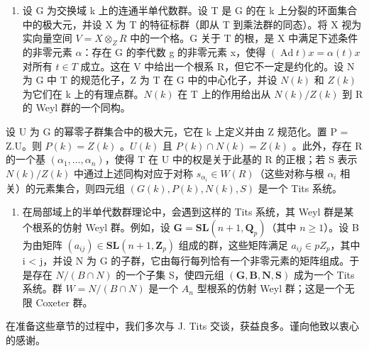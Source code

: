 \begin{enumerate}
\def\labelenumi{\Roman{enumi}.}
\setcounter{enumi}{2}
\tightlist
\item
  设 G 为交换域 k 上的连通半单代数群。设 T 是 G 的在 k 上分裂的环面集合中的极大元，并设 X 为 T 的特征标群（即从 T 到乘法群的同态）。将 X 视为实向量空间 \(V = X \otimes_{Z} R\) 中的一个格。G 关于 T 的根，是 X 中满足下述条件的非零元素 \(\alpha\)：存在 G 的李代数 g 的非零元素 x，使得 \((\operatorname{Ad} t)x = \alpha(t)x\) 对所有 \(t \in T\) 成立。这在 V 中给出一个根系 R，但它不一定是约化的。设 N 为 G 中 T 的规范化子，Z 为 T 在 G 中的中心化子，并设 \(N(k)\) 和 \(Z(k)\) 为它们在 k 上的有理点群。\(N(k)\) 在 T 上的作用给出从 \(N(k)/Z(k)\) 到 R 的 Weyl 群的一个同构。
\end{enumerate}

设 U 为 G 的幂零子群集合中的极大元，它在 k 上定义并由 Z 规范化。置 P = Z.U。则 \(P(k) = Z(k)\) 。\(U(k)\) 且 \(P(k) \cap N(k) = Z(k)\) 。此外，存在 R 的一个基 \((\alpha_{1}, \ldots, \alpha_{n})\)，使得 T 在 U 中的权是关于此基的 R 的正根；若 S 表示 \(N(k)/Z(k)\) 中通过上述同构对应于对称 \(s_{\alpha_{i}} \in W(R)\)（这些对称与根 \(\alpha_{i}\) 相关）的元素集合，则四元组 \((G(k), P(k), N(k), S)\) 是一个 Tits 系统。

\begin{enumerate}
\def\labelenumi{\Roman{enumi}.}
\setcounter{enumi}{3}
\tightlist
\item
  在局部域上的半单代数群理论中，会遇到这样的 Tits 系统，其 Weyl 群是某个根系的仿射 Weyl 群。例如，设 \(\mathbf{G} = \mathbf{S}\mathbf{L}(n + 1, \mathbf{Q}_{p})\)（其中 \(n \geq 1\)）。设 B 为由矩阵 \((a_{ij}) \in \mathbf{S}\mathbf{L}(n + 1, \mathbf{Z}_{p})\) 组成的群，这些矩阵满足 \(a_{ij} \in pZ_{p}\)，其中 i \textless{} j，并设 N 为 G 的子群，它由每行每列恰有一个非零元素的矩阵组成。于是存在 \(N/(B \cap N)\) 的一个子集 S，使四元组 \((\mathbf{G}, \mathbf{B}, \mathbf{N}, \mathbf{S})\) 成为一个 Tits 系统。群 \(W = N/(B \cap N)\) 是一个 \(A_{n}\) 型根系的仿射 Weyl 群；这是一个无限 Coxeter 群。
\end{enumerate}

在准备这些章节的过程中，我们多次与 J. Tits 交谈，获益良多。谨向他致以衷心的感谢。
